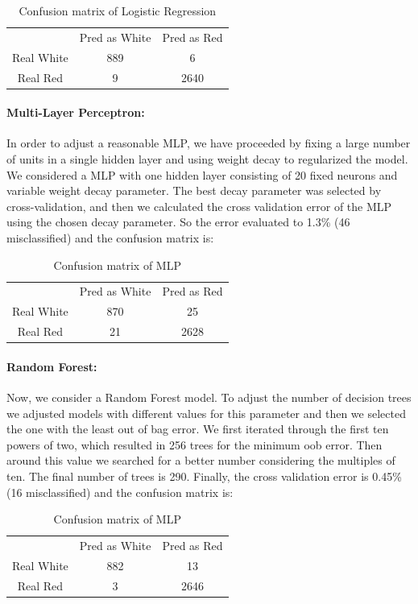 \documentclass[10pt]{article}
\begin{document}
\begin{table}[H]
\centering
\caption{Confusion matrix of Logistic Regression}
\begin{tabular}{ccc}
 & Pred as White & Pred as Red \\
Real White & 889 & 6 \\
Real Red  & 9 & 2640
\end{tabular}
\end{table}



\paragraph{Multi-Layer Perceptron:}
In order to adjust a reasonable MLP, we have proceeded by fixing a large number of units in a single hidden layer and using weight decay to regularized the model. We considered a MLP with one hidden layer consisting of 20 fixed neurons and variable weight decay parameter. The best decay parameter was selected by cross-validation, and then we calculated the cross validation error of the MLP using the chosen decay parameter. So the error evaluated to 1.3\% (46 misclassified) and the confusion matrix is:

\begin{table}[H]
\centering
\caption{Confusion matrix of MLP}
\begin{tabular}{ccc}
 & Pred as White & Pred as Red \\
Real White & 870 & 25 \\
Real Red  & 21 & 2628
\end{tabular}
\end{table}

\paragraph{Random Forest:}
Now, we consider a Random Forest model. To adjust the number of decision trees we adjusted models with different values for this parameter and then we selected the one with the least out of bag error. We first iterated through the first ten powers of two, which resulted in 256 trees for the minimum oob error. Then around this value we searched for a better number considering the multiples of ten. The final number of trees is 290. Finally, the cross validation error is 0.45\% (16 misclassified) and the confusion matrix is:

\begin{table}[H]
\centering
\caption{Confusion matrix of MLP}
\begin{tabular}{ccc}
 & Pred as White & Pred as Red \\
Real White & 882 & 13 \\
Real Red  & 3 & 2646
\end{tabular}
\end{table}
\end{document}
